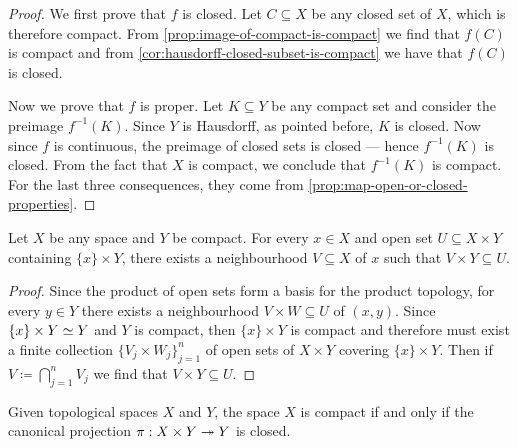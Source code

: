 \begin{proof}
We first prove that \(f\) is closed. Let \(C \subseteq X\) be any closed set of
\(X\), which is therefore compact. From \cref{prop:image-of-compact-is-compact}
we find that \(f(C)\) is compact and from
\cref{cor:hausdorff-closed-subset-is-compact} we have that \(f(C)\) is closed.

Now we prove that \(f\) is proper. Let \(K \subseteq Y\) be any compact set and
consider the preimage \(f^{-1}(K)\). Since \(Y\) is Hausdorff, as pointed
before, \(K\) is closed. Now since \(f\) is continuous, the preimage of closed
sets is closed --- hence \(f^{-1}(K)\) is closed. From the fact that \(X\) is
compact, we conclude that \(f^{-1}(K)\) is compact. For the last three
consequences, they come from \cref{prop:map-open-or-closed-properties}.
\end{proof}

\begin{lemma}
\label{lem:tube-lemma}
Let \(X\) be any space and \(Y\) be compact. For every \(x \in X\) and open set
\(U \subseteq X \times Y\) containing \(\{x\} \times Y\), there exists a
neighbourhood \(V \subseteq X\) of \(x\) such that \(V \times Y \subseteq U\).
\end{lemma}

\begin{proof}
Since the product of open sets form a basis for the product topology, for every
\(y \in Y\) there exists a neighbourhood \(V \times W \subseteq U\) of
\((x, y)\). Since \(\{x\} \times Y \simeq Y\) and \(Y\) is compact, then
\(\{x\} \times Y\) is compact and therefore must exist a finite collection
\(\{V_j \times W_j\}_{j=1}^n\) of open sets of \(X \times Y\) covering
\(\{x\} \times Y\). Then if \(V \coloneq \bigcap_{j=1}^n V_j\) we find that
\(V \times Y \subseteq U\).
\end{proof}

\begin{theorem}
\label{prop:compact-iff-projection-closed}
Given topological spaces \(X\) and \(Y\), the space \(X\) is compact if and only
if the canonical projection \(\pi: X \times Y \twoheadrightarrow Y\) is closed.
\end{theorem}

